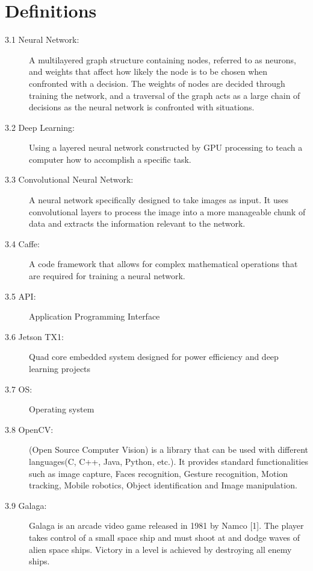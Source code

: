 \documentclass{scrreprt}
\begin{document}
\chapter{Definitions}
\begin{description}

  \item[3.1 Neural Network:] A multilayered graph structure containing nodes, referred to as neurons, and weights that affect how likely the node is to be chosen when confronted with a decision.
The weights of nodes are decided through training the network, and a traversal of the graph acts as a large chain of decisions as the neural network is confronted with situations.

  \item[3.2 Deep Learning:]  Using a layered neural network constructed by GPU processing to teach a computer how to accomplish a specific task.

  \item[3.3 Convolutional Neural Network:] A neural network specifically designed to take images as input. 
It uses convolutional layers to process the image into a more manageable chunk of data and extracts the information relevant to the network.

  \item[3.4 Caffe:] A code framework that allows for complex mathematical operations that are required for training a neural network.

  \item[3.5 API:] Application Programming Interface

  \item[3.6 Jetson TX1:] Quad core embedded system designed for power efficiency and deep learning projects

  \item[3.7 OS:] Operating system

  \item[3.8 OpenCV:] (Open Source Computer Vision) is a library that can be used with different languages(C, C++, Java, Python, etc.). It provides standard functionalities such as image capture, Faces recognition, Gesture recognition, Motion tracking, Mobile robotics, Object identification and Image manipulation.
  
  \item[3.9 Galaga:] Galaga is an arcade video game released in 1981 by Namco [1]. The player takes control of a small space ship and must shoot at and dodge waves of alien space ships. 
Victory in a level is achieved by destroying all enemy ships.

\end{description}
\end{document}
